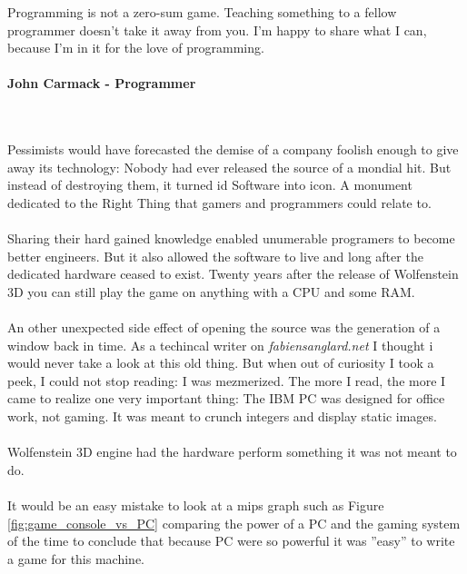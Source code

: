  \begin{fancyquotes}
   Programming is not a zero-sum game. Teaching something to a fellow programmer doesn't take it away from you. I'm happy to share what I can, because I'm in it for the love of programming.\\
   \\
\textbf{John Carmack - Programmer}
 \end{fancyquotes}\\
\\
Pessimists would have forecasted the demise of a company foolish enough to give away its technology: Nobody had ever released the source of a mondial hit. But instead of destroying them, it turned id Software into icon. A monument dedicated to the Right Thing that gamers and programmers could relate to.\\
\\
Sharing their hard gained knowledge enabled unumerable programers to become better engineers. But it also allowed the software to live and long after the dedicated hardware ceased to exist. Twenty years after the release of Wolfenstein 3D you can still play the game on anything with a CPU and some RAM. \\
\\
An other unexpected side effect of opening the source was the generation of a window back in time. As a techincal writer on \emph{fabiensanglard.net} I thought i would never take a look at this old thing. But when out of curiosity I took a peek, I could not stop reading: I was mezmerized. The more I read, the more I came to realize one very important thing: The IBM PC was designed for office work, not gaming. It was meant to crunch integers and display static images.\\
\\ 
Wolfenstein 3D engine had the hardware perform something it was not meant to do.\\
\\
It would be an easy mistake to look at a mips graph such as Figure \ref{fig:game_console_vs_PC} comparing the power of a PC and the gaming system of the time to conclude that because PC were so powerful it was ''easy'' to write a game for this machine. \\
\\
